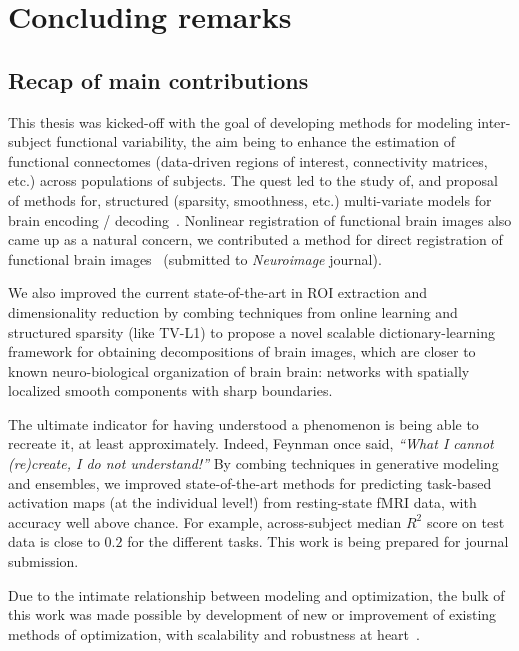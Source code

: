 \chapter{\;\;Concluding remarks}\label{chap:conclusion}

\minitoc

\section{Recap of main contributions}
This thesis was kicked-off with the goal of developing methods for modeling inter-subject
functional variability, the aim being to enhance the estimation of functional connectomes
(data-driven regions of interest, connectivity matrices, etc.)
across populations of subjects. The quest led to the study of, and proposal of methods for, structured (sparsity, smoothness, etc.) multi-variate models for brain encoding / decoding~\citep{dohmatob2015speeding,abrahamregion,eickenberg2015total,pelle2016multivariate}. Nonlinear registration of functional brain images also came up as a natural concern, we contributed a method for direct registration of functional brain images~\citep{dohmatob2016epi2epi} (submitted to \textit{Neuroimage} journal).

We also improved the current state-of-the-art in ROI extraction and dimensionality reduction by combing techniques from online learning and structured sparsity (like TV-L1) to propose a novel scalable dictionary-learning framework for obtaining decompositions of brain images, which are closer to known neuro-biological organization of brain brain: networks with spatially localized smooth components with sharp boundaries.

The ultimate indicator for having understood a phenomenon is being able to recreate it, at least approximately. Indeed, Feynman once said, \textit{``What I cannot (re)create, I do not understand!''} By combing techniques in generative modeling and ensembles, we improved state-of-the-art methods for predicting task-based activation maps (at the individual level!) from resting-state fMRI data, with accuracy well above chance. For example, across-subject median $R^2$ score on test data is close to $0.2$ for the different tasks. This work is being prepared for journal submission.

Due to the intimate relationship between modeling and optimization, the
bulk of this work was made possible by development of new or improvement of existing methods of
optimization, with scalability and robustness at heart~\citep{dohmatob2014benchmarking,dohmatob2015local,varoquaux2015faasta,dohmatob2015simple}.

